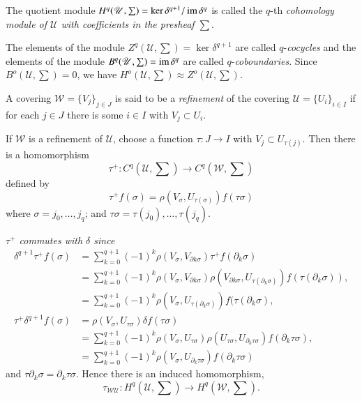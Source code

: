 The quotient module $H^q(\mathscr{U}, \sum) = \ker \delta^{q+1}/ \operatorname{im}
\delta^q$ is called the $q$-th \textit{cohomology module of
  $\mathscr{U}$ with coefficients in the presheaf $\sum$}. 

The elements of the module $Z^q(\mathscr{U}, \sum) = \ker
\delta^{q+1}$ are called $q$-\textit{cocycles} and the elements of
the module $B^q(\mathscr{U}, \sum) = \operatorname{im} \delta^q$ are called
$q$-\textit{coboundaries}. Since $B^o(\mathscr{U}, \sum) = 0$, we have
$H^o (\mathscr{U}, \sum) \approx Z^o(\mathscr{U}, \sum)$. 

\begin{defi*}%
A covering $\mathscr{W} = \{V_j\}_{j \in J}$ is said to be a
\textit{refinement} of the covering $\mathscr{U} = \{ U_i\}_{i \in I}$
if for each $j \in J$ there is some $i \in I$ with $V_j \subset U_i$. 
\end{defi*}

If $\mathscr{W}$ is a refinement of $\mathscr{U}$, choose a function
$\tau : J \to I$ with $V_j \subset U_{\tau(j)}$. Then there is a
homomorphism 
$$
\tau^+ : C^q (\mathscr{U}, \sum) \to C^q (\mathscr{W}, \sum)  
$$
defined by 
$$
\tau^+ f(\sigma) = \rho (V_\sigma , U_{\tau(\sigma)}) f(\tau \sigma)  
$$
where $\sigma = j_0, \ldots , j_q$; and $\tau \sigma = \tau(j_0),
\ldots , \tau(j_q)$. 

\textit{$\tau^+$ commutes with $\delta$ since} 
\begin{align*}
\delta^{q+1} \tau^+ f(\sigma) &= \sum^{q+1}_{k=0}(-1)^k \rho
(V_\sigma , V_{\partial k \sigma}) \tau^+ f(\partial_k \sigma)\\ 
& = \sum^{q+1}_{k=0}(-1)^k \rho (V_\sigma , V_{\partial k \sigma})
\rho(V_{\partial k \sigma} , U_{\tau(\partial_k \sigma)})
f(\tau(\partial_k \sigma)),\\ 
& = \sum^{q+1}_{k=0}(-1)^k \rho (V_\sigma , U_{\tau(\partial_k
  \sigma)})  f(\tau(\partial_k \sigma),\\ 
\tau^+ \delta^{q+1} f(\sigma) &= \rho(V_\sigma , U_{\tau \sigma})
\delta f(\tau \sigma)\\ 
& = \sum^{q+1}_{k=0}(-1)^k \rho (V_\sigma , U_{\tau \sigma})
\rho(U_{\tau \sigma}, U_{\partial_k \tau \sigma}) f(\partial_k \tau
\sigma),\\ 
& = \sum^{q+1}_{k=0}(-1)^k \rho (V_\sigma , U_{\partial_k \tau
  \sigma}) f(\partial_k \tau \sigma)
\end{align*}\pageoriginale
and $\tau \partial_k \sigma = \partial_k \tau \sigma$. Hence there is an
induced homomorphism, 
$$
\tau_{\mathscr{W} \mathscr{U}}: H^q (\mathscr{U}, \sum) \to H^q
(\mathscr{W}, \sum). 
$$

